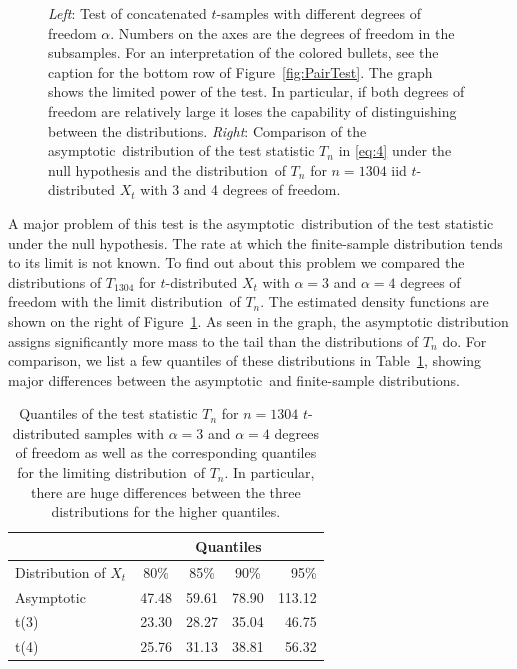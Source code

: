 \documentclass[11pt,a4]{amsart}
\newcommand{\asy}{asymptotic}
\newcommand{\ds}{distribution}
\newcommand{\1}{{\mathbf 1}}
\begin{document}
\begin{figure}[htb!]
\begin{minipage}{0.5\linewidth}
  \end{minipage}
  \caption{
    {\em Left}: Test  of concatenated $t$-samples with different
    degrees of freedom $\alpha$. Numbers on the axes are the degrees of freedom
    in the subsamples. For an interpretation of the colored bullets,
    see the caption for the bottom row of Figure~\ref{fig:PairTest}. The graph shows the limited power
    of the test. In particular, if both degrees of freedom are
    relatively large it loses the capability of distinguishing between the \ds s.
    {\em Right}: Comparison of the \asy\ distribution of the test statistic
    $T_n$ in \eqref{eq:4} under the null hypothesis and the \ds\ of
    $T_n$ for $n=1304$ iid $t$-distributed $X_t$ with 3 and 4 degrees
    of freedom.
  }
  \label{fig:t_sim_pair}
\end{figure}

A major problem of this test is the \asy\ distribution of the test statistic under the
null hypothesis.  The rate at which the finite-sample distribution tends to its limit is not known.
To find out about this problem we compared the \ds s of $T_{1304}$ 
for $t$-distributed $X_t$ with  $\alpha=3$ and $\alpha=4$ degrees of freedom with
the limit \ds\ of $T_n$.
The estimated density functions are shown on the right of Figure~\ref{fig:t_sim_pair}.
As seen in the graph, the asymptotic distribution assigns
significantly more mass to the tail than the \ds s of $T_n$ do. For
comparison, we list a few quantiles of these \ds s in
Table~\ref{tab:HogaAsymptotic}, showing major differences between the
\asy\ and finite-sample \ds s.
\begin{table}[htb!]
  \centering
  \begin{tabular}{l|c|c|c|r}
    & \multicolumn{4}{c}{Quantiles} \\[2mm]
    \hline
    Distribution of $X_t$& 80\% & 85\% & 90\% & 95\% \\
    \hline
    Asymptotic & 47.48 & 59.61 & 78.90 & 113.12 \\
    t(3)  & 23.30 & 28.27 & 35.04 & 46.75 \\
    t(4)  & 25.76 & 31.13 & 38.81 & 56.32\\[2mm]
  \end{tabular}
  \caption{Quantiles of the test statistic $T_n$ for $n=1304$
    $t$-distributed samples with $\alpha=3$ and $\alpha=4$ 
degrees of freedom
    as well as the corresponding quantiles for the limiting \ds\ of
    $T_n$. In particular, there are huge differences between the three
    \ds s  for the higher quantiles. 
    }
  \label{tab:HogaAsymptotic}
\end{table}
\end{document}
